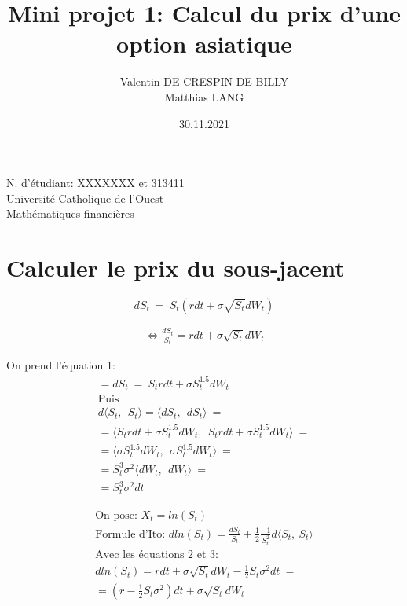 \documentclass[a4paper,12pt]{scrartcl}
\title{Mini projet 1: Calcul du prix d'une option asiatique}
\author{Valentin DE CRESPIN DE BILLY \\ Matthias LANG}
\date{30.11.2021}
\begin{document}
\maketitle
\begin{center}

  \thispagestyle{empty}

  N. d'étudiant: XXXXXXX et 313411\\
  Université Catholique de l'Ouest\\
  Mathématiques financières

\end{center}

\newpage

\section{Calculer le prix du sous-jacent}

\begin{equation} \label{1} 
dS_t~=~S_t(rdt+\sigma \sqrt{S_t} dW_t) 
\end{equation}

\begin{equation} \label{2}
\begin{multlined}
     \iff \frac{dS_t}{S_t} = rdt+\sigma \sqrt{S_t} dW_t
\end{multlined}
\end{equation}


On prend l'équation 1:
\begin{equation} \label{3}
\begin{multlined}
= dS_t~=~S_trdt+\sigma S_t^{1.5} dW_t \\
\text{Puis} \\
d \langle S_t,~~ S_t\rangle 
=\langle dS_t,~~ dS_t\rangle ~=\\
=\langle S_trdt+\sigma S_t^{1.5} dW_t,~~
         S_trdt+\sigma S_t^{1.5} dW_t \rangle ~=\\
=\langle \sigma S_t^{1.5} dW_t,~~
         \sigma S_t^{1.5} dW_t \rangle ~=\\
=S_t^3 \sigma^2 \langle dW_t,~~ dW_t \rangle ~=\\
=S_t^3 \sigma^2 dt
\end{multlined}
\end{equation}



\begin{equation} \label{4}
\begin{multlined}
\text{On pose: } X_t = ln(S_t) \\
\text{Formule d'Ito: } dln(S_t) = \frac{dS_t}{S_t} + \frac{1}{2} \frac{-1}{S_t^2}d \langle S_t, ~S_t \rangle \\
\text{Avec les équations 2 et 3:} \\
dln(S_t) = rdt + \sigma \sqrt{S_t} dW_t - \frac{1}{2}S_t \sigma^2 dt ~= \\
= (r - \frac{1}{2}S_t\sigma^2)dt + \sigma\sqrt{S_t}dW_t
\end{multlined}
\end{equation}
\end{document}
